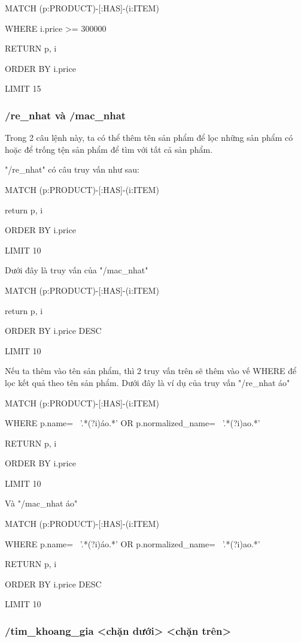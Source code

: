 MATCH (p:PRODUCT)-[:HAS]-(i:ITEM)

WHERE i.price >= 300000 

RETURN p, i 

ORDER BY i.price  

LIMIT 15

\smallskip

\subsubsection{/re\_nhat và /mac\_nhat }

Trong 2 câu lệnh này, ta có thể thêm tên sản phẩm để lọc những sản phẩm có hoặc để trống tện sản phẩm để tìm với tất cả sản phẩm. 

"/re\_nhat" có câu truy vấn như sau: 

MATCH (p:PRODUCT)-[:HAS]-(i:ITEM)

return p, i 

ORDER BY i.price  

LIMIT 10

\smallskip

Dưới đây là truy vấn của "/mac\_nhat" 

MATCH (p:PRODUCT)-[:HAS]-(i:ITEM)

return p, i 

ORDER BY i.price DESC 

LIMIT 10

\smallskip

Nếu ta thêm vào tên sản phẩm, thì 2 truy vấn trên sẽ thêm vào vế WHERE để lọc kết quả theo tên sản phẩm. Dưới đây là ví dụ của truy vấn "/re\_nhat áo" 

MATCH (p:PRODUCT)-[:HAS]-(i:ITEM)

WHERE p.name=~ '.*(?i)áo.*' OR p.normalized\_name=~ '.*(?i)ao.*' 

RETURN p, i 

ORDER BY i.price  

LIMIT 10

\smallskip

Và "/mac\_nhat áo"

MATCH (p:PRODUCT)-[:HAS]-(i:ITEM)

WHERE p.name=~ '.*(?i)áo.*' OR p.normalized\_name=~ '.*(?i)ao.*' 

RETURN p, i 

ORDER BY i.price DESC 

LIMIT 10

\subsubsection{/tim\_khoang\_gia <chặn dưới> <chặn trên>}

